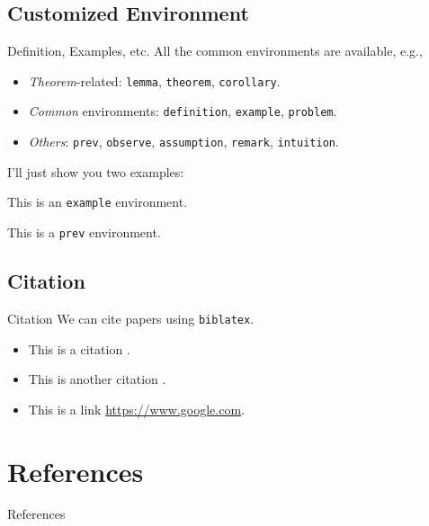 \documentclass[aspectratio=169, xcolor={dvipsnames}, hyperref={colorlinks=true,linkcolor=themecolor, urlcolor=magenta,citecolor=violet, hyperfootnotes=true}]{beamer}
\begin{document}
\subsection{Customized Environment}

\begin{frame}{Definition, Examples, etc.}
    All the common environments are available, e.g.,
    \begin{itemize}
        \item \emph{Theorem}-related: \texttt{lemma}, \texttt{theorem}, \texttt{corollary}.
        \item \emph{Common} environments: \texttt{definition}, \texttt{example}, \texttt{problem}.
        \item \emph{Others}: \texttt{prev}, \texttt{observe}, \texttt{assumption}, \texttt{remark}, \texttt{intuition}.
    \end{itemize}

    I'll just show you two examples:

    \begin{example}[A demonstration]
        This is an \texttt{example} environment.
    \end{example}

    \begin{prev}
        This is a \texttt{prev} environment.
    \end{prev}
\end{frame}

\subsection{Citation}
\begin{frame}{Citation}
    We can cite papers using \texttt{biblatex}.
    \begin{itemize}
        \item This is a citation \cite{smith2025example}.
        \item This is another citation \cite{johnson2024innovative, lee2023computational}.
        \item This is a link \url{https://www.google.com}.
    \end{itemize}
\end{frame}

\section{References}

\begin{frame}{References}
    \printbibliography
\end{frame}
\end{document}
